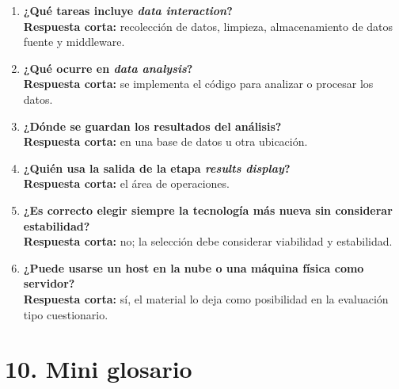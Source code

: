 \documentclass[8pt,a4paper,twocolumn]{article}
\begin{document}
\begin{enumerate}[leftmargin=*]
    \item \textbf{¿Qué tareas incluye \textit{data interaction}?}\\
    \textbf{Respuesta corta:} recolección de datos, limpieza, almacenamiento de datos fuente y middleware.
    
    \item \textbf{¿Qué ocurre en \textit{data analysis}?}\\
    \textbf{Respuesta corta:} se implementa el código para analizar o procesar los datos.
    
    \item \textbf{¿Dónde se guardan los resultados del análisis?}\\
    \textbf{Respuesta corta:} en una base de datos u otra ubicación.
    
    \item \textbf{¿Quién usa la salida de la etapa \textit{results display}?}\\
    \textbf{Respuesta corta:} el área de operaciones.
    
    \item \textbf{¿Es correcto elegir siempre la tecnología más nueva sin considerar estabilidad?}\\
    \textbf{Respuesta corta:} no; la selección debe considerar viabilidad y estabilidad.
    
    \item \textbf{¿Puede usarse un host en la nube o una máquina física como servidor?}\\
    \textbf{Respuesta corta:} sí, el material lo deja como posibilidad en la evaluación tipo cuestionario.
\end{enumerate}

\section*{10. Mini glosario}
\end{document}
